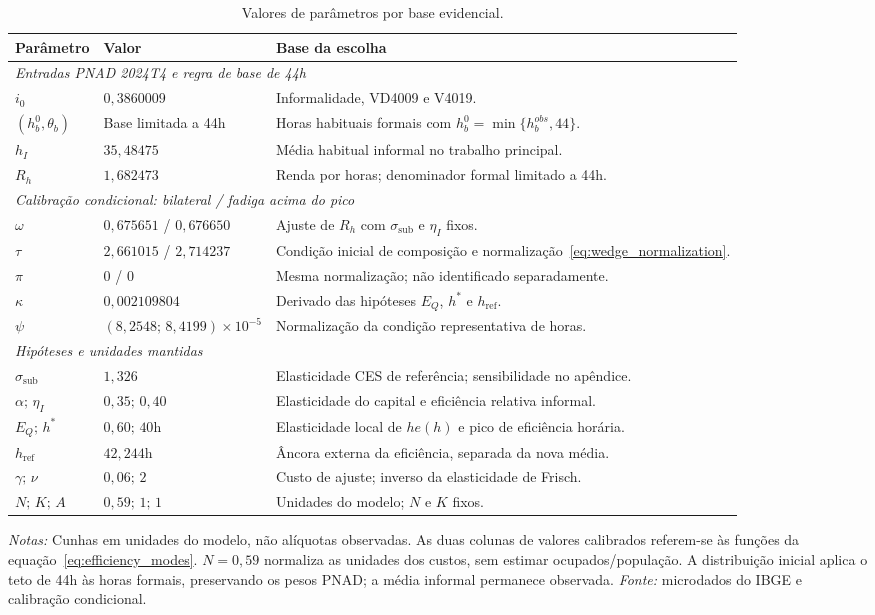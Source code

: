 \begin{table}[p]
\centering
\caption{Valores de parâmetros por base evidencial.}\label{tab:params}
\normalsize
\begin{tabular}{@{}p{2.1cm}p{4.1cm}p{8.1cm}@{}}
\toprule
Parâmetro & Valor & Base da escolha \\
\midrule
\multicolumn{3}{l}{\textit{Entradas PNAD 2024T4 e regra de base de 44h}} \\
$i_0$ & $0{,}3860009$ & Informalidade, VD4009 e V4019. \\
$(h_b^0,\theta_b)$ & Base limitada a 44h & Horas habituais formais com $h_b^0=\min\{h_b^{obs},44\}$. \\
$h_I$ & $35{,}48475$ & Média habitual informal no trabalho principal. \\
$R_h$ & $1{,}682473$ & Renda por horas; denominador formal limitado a 44h. \\
\midrule
\multicolumn{3}{l}{\textit{Calibração condicional: bilateral / fadiga acima do pico}} \\
$\omega$ & $0{,}675651$ / $0{,}676650$ & Ajuste de $R_h$ com $\sigma_{\mathrm{sub}}$ e $\eta_I$ fixos. \\
$\tau$ & $2{,}661015$ / $2{,}714237$ & Condição inicial de composição e normalização~\eqref{eq:wedge_normalization}. \\
$\pi$ & $0$ / $0$ & Mesma normalização; não identificado separadamente. \\
$\kappa$ & $0{,}002109804$ & Derivado das hipóteses $E_Q$, $h^*$ e $h_{\mathrm{ref}}$. \\
$\psi$ & $(8{,}2548;\,8{,}4199)\times10^{-5}$ & Normalização da condição representativa de horas. \\
\midrule
\multicolumn{3}{l}{\textit{Hipóteses e unidades mantidas}} \\
$\sigma_{\mathrm{sub}}$ & $1{,}326$ & Elasticidade CES de referência; sensibilidade no apêndice. \\
$\alpha;\,\eta_I$ & $0{,}35;\,0{,}40$ & Elasticidade do capital e eficiência relativa informal. \\
$E_Q;\,h^*$ & $0{,}60;\,40$h & Elasticidade local de $he(h)$ e pico de eficiência horária. \\
$h_{\mathrm{ref}}$ & $42{,}244$h & Âncora externa da eficiência, separada da nova média. \\
$\gamma;\,\nu$ & $0{,}06;\,2$ & Custo de ajuste; inverso da elasticidade de Frisch. \\
$N;\,K;\,A$ & $0{,}59;\,1;\,1$ & Unidades do modelo; $N$ e $K$ fixos. \\
\bottomrule
\end{tabular}
\begin{minipage}{0.97\textwidth}
\normalsize\justifying
\textit{Notas:} Cunhas em unidades do modelo, não alíquotas observadas. As duas colunas de valores calibrados referem-se às funções da equação~\eqref{eq:efficiency_modes}. $N=0{,}59$ normaliza as unidades dos custos, sem estimar ocupados/população. A distribuição inicial aplica o teto de 44h às horas formais, preservando os pesos PNAD; a média informal permanece observada. \textit{Fonte:} microdados do IBGE e calibração condicional.
\end{minipage}
\end{table}

